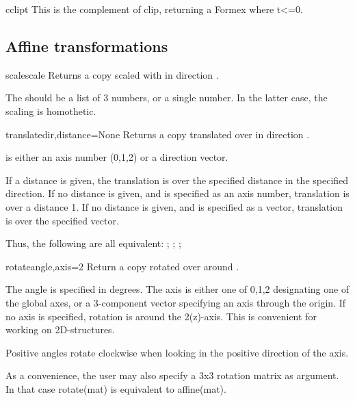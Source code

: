 {{\begin{methoddesc}{cclip}{t}
This is the complement of clip, returning a Formex where t<=0.
\end{methoddesc}



\subsection{Affine transformations}

\begin{methoddesc}{scale}{scale}
Returns a copy scaled with  in direction .

The  should be a list of 3 numbers, or a single number. In the latter case, the scaling is homothetic.
\end{methoddesc}

\begin{methoddesc}{translate}{dir,distance=None}
Returns a copy translated over  in direction .

 is either an axis number (0,1,2) or a direction vector.

If a distance is given, the translation is over the specified
distance in the specified direction.
If no distance is given, and  is specified as an axis number,
translation is over a distance 1.
If no distance is given, and  is specified as a vector, translation
is over the specified vector.

Thus, the following are all equivalent:
;
;
;
\end{methoddesc}

\begin{methoddesc}{rotate}{angle,axis=2}
Return a copy rotated over  around .

The angle is specified in degrees.
The axis is either one of 0,1,2 designating one of the global axes,
or a 3-component vector specifying an axis through the origin.
If no axis is specified, rotation is around the 2(z)-axis. This is
convenient for working on 2D-structures.

Positive angles rotate clockwise when looking in the positive direction of the axis.

As a convenience, the user may also specify a 3x3 rotation matrix as argument.
In that case rotate(mat) is equivalent to affine(mat).
\end{methoddesc}


}}
